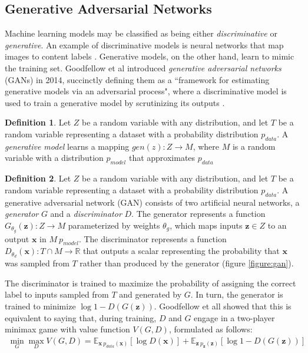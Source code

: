 \documentclass[12pt, titlepage]{report}
\theoremstyle{definition}
\newtheorem{definition}{Definition}
\begin{document}
\subsection{Generative Adversarial Networks}\label{subsection:generativeadversarial}
Machine learning models may be classified as being either \textit{discriminative} or \textit{generative}. An example of discriminative models is neural networks that map images to content labels \cite[p. 1]{goodfellow2014generative}. Generative models, on the other hand, learn to mimic the training set. Goodfellow et al introduced \emph{generative adversarial networks} (GANs) in 2014, succinctly defining them as a ``framework for estimating generative models via an adversarial process", where a discriminative model is used to train a generative model by scrutinizing its outputs \cite[p. 1]{goodfellow2014generative}.

\begin{definition}
Let $Z$ be a random variable with any distribution, and let $T$ be a random variable representing a dataset with a probability distribution $p_{data}$. A \emph{generative model} learns a mapping $gen(z) : Z \rightarrow M$, where $M$ is a random variable with a distribution $p_{model}$ that approximates $p_{data}$ \cite{goodfellow2016nips.}
\end{definition}

\begin{definition}
Let $Z$ be a random variable with any distribution, and let $T$ be a random variable representing a dataset with a probability distribution $p_{data}$. A generative adversarial network (GAN) consists of two artificial neural networks, a \emph{generator} $G$ and a \emph{discriminator} $D$. The generator represents a function $G_{\theta_{g}}(\bm{z}) : Z \rightarrow M$ parameterized by weights $\theta_g$, which maps inputs $\bm{z} \in Z$ to an output $\bm{x}$ in $M ~ p_{model}$. The discriminator represents a function $D_{\theta_d}(\bm{x}) : T \cap M \rightarrow \mathbb{R}$ that outputs a scalar representing the probability that $\bm{x}$ was sampled from $T$ rather than produced by the generator (figure \ref{figure:gan}).

The discriminator is trained to maximize the probability of assigning the correct label to inputs sampled from $T$ and generated by $G$. In turn, the generator is trained to minimize $\log{1 - D(G(\bm{z}))}$. Goodfellow et all \cite[p. 3]{goodfellow2014generative} showed that this is equivalent to saying that, during training, $D$ and $G$ engage in a two-player minimax game with value function $V(G, D)$, formulated as follows:
\begin{gather}\label{eq:gan_train}
\min_G{\max_D{V(G, D)}} = \mathbb{E}_{\bm{x}~p_{data}(\bm{x})}[\log{D(\bm{x})}] + \mathbb{E}_{\bm{z}~p_{\bm{z}}(\bm{z})}[\log{1 - D(G(\bm{z}))}]
\end{gather}
\end{definition}
\end{document}
